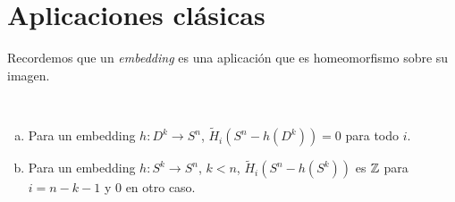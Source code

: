 \documentclass[TA.tex]{subfiles}
\begin{document}
\section{Aplicaciones clásicas}

Recordemos que un \emph{embedding} es una aplicación que es homeomorfismo sobre su imagen.

\begin{prop}\
\begin{enumerate}[(a)]
\item
 Para un embedding $h:D^k\to S^n$, $\widetilde{H}_i(S^n-h(D^k))=0$ para todo $i$.
\item 
 Para un embedding $h:S^k\to S^n$, $k<n$, $\widetilde{H}_i(S^n-h(S^k))$ es $\mathbb{Z}$ para $i=n-k-1$ y 0 en otro caso.
\end{enumerate}
\end{prop}
\end{document}
